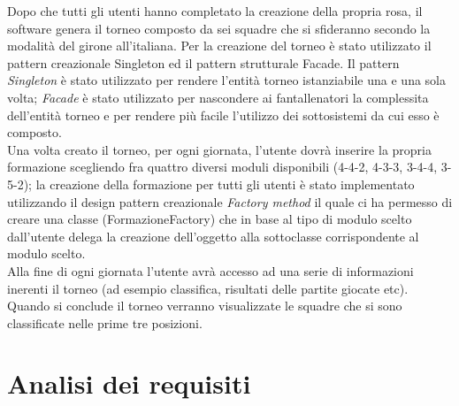 \documentclass[12pt,a4paper]{article}
\begin{document}
Dopo che tutti gli utenti hanno completato la creazione della propria rosa, il software genera il torneo composto da sei squadre che si sfideranno secondo la modalità del girone all'italiana. Per la creazione del torneo è stato utilizzato il pattern creazionale Singleton ed il pattern strutturale Facade. Il pattern \textit{Singleton} è stato utilizzato per rendere l'entità torneo istanziabile una e una sola volta; \textit{Facade} è stato utilizzato per nascondere ai fantallenatori la  complessita dell'entità torneo e per rendere più facile l'utilizzo dei sottosistemi da cui esso è composto.\\
Una volta creato il torneo, per ogni giornata, l'utente dovrà inserire la propria formazione scegliendo fra quattro diversi moduli disponibili (4-4-2, 4-3-3, 3-4-4, 3-5-2); la creazione della formazione per tutti gli utenti è stato implementato utilizzando il design pattern creazionale \textit{Factory method} il quale ci ha permesso di creare una classe (FormazioneFactory) che in base al tipo di modulo scelto dall'utente delega la creazione dell'oggetto alla sottoclasse corrispondente al modulo scelto.\\
Alla fine di ogni giornata l'utente avrà accesso ad una serie di informazioni inerenti il torneo (ad esempio classifica, risultati delle partite giocate etc).\\ Quando si conclude il torneo verranno visualizzate le squadre che si sono classificate nelle prime tre posizioni.
\section{Analisi dei requisiti}
\end{document}
